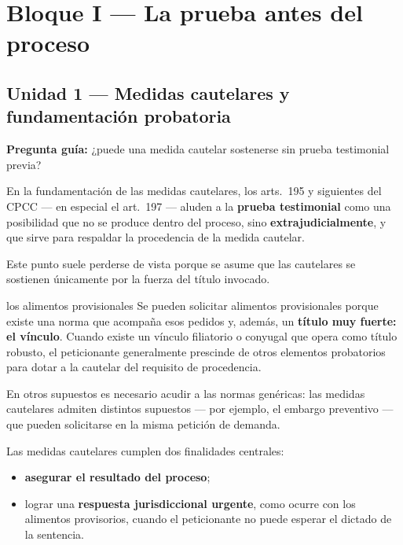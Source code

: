 \documentclass[12pt,oneside]{book}
\begin{document}
\chapter[Bloque I --- La prueba antes del proceso]{Bloque I --- La prueba antes del proceso}

\section{Unidad 1 --- Medidas cautelares y fundamentación probatoria}

\textbf{Pregunta guía:} ¿puede una medida cautelar sostenerse sin prueba testimonial previa?

En la fundamentación de las medidas cautelares, los arts.\ 195 y siguientes del CPCC --- en especial el art.\ 197 --- aluden a la \textbf{prueba testimonial} como una posibilidad que no se produce dentro del proceso, sino \textbf{extrajudicialmente}, y que sirve para respaldar la procedencia de la medida cautelar.

Este punto suele perderse de vista porque se asume que las cautelares se sostienen únicamente por la fuerza del título invocado.

\begin{example}{los alimentos provisionales}
Se pueden solicitar alimentos provisionales porque existe una norma que acompaña esos pedidos y, además, un \textbf{título muy fuerte: el vínculo}. Cuando existe un vínculo filiatorio o conyugal que opera como título robusto, el peticionante generalmente prescinde de otros elementos probatorios para dotar a la cautelar del requisito de procedencia.

En otros supuestos es necesario acudir a las normas genéricas: las medidas cautelares admiten distintos supuestos --- por ejemplo, el embargo preventivo --- que pueden solicitarse en la misma petición de demanda.
\end{example}

Las medidas cautelares cumplen dos finalidades centrales:

\begin{itemize}
    \item \textbf{asegurar el resultado del proceso};
    \item lograr una \textbf{respuesta jurisdiccional urgente}, como ocurre con los alimentos provisorios, cuando el peticionante no puede esperar el dictado de la sentencia.
\end{itemize}
\end{document}
